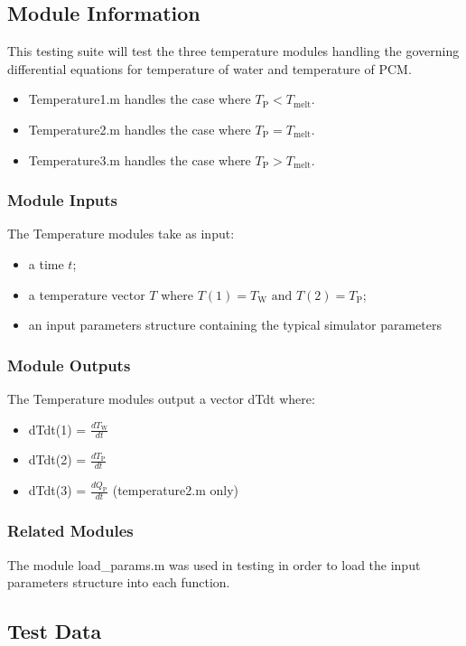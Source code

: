 \documentclass[12pt]{article}
\begin{document}
\subsection{Module Information}
This testing suite will test the three temperature modules handling the governing 
differential equations for temperature of water and temperature of PCM.
\begin{itemize}
\item Temperature1.m handles the case where $T_{\text{P}} < T_{\text{melt}}$.
\item Temperature2.m handles the case where $T_{\text{P}} = T_{\text{melt}}$.
\item Temperature3.m handles the case where $T_{\text{P}} > T_{\text{melt}}$.
\end{itemize}

\subsubsection{Module Inputs}
The Temperature modules take as input:
\begin{itemize}
\item a time $t$;
\item a temperature vector $T$ where $T(1) = T_{\text{W}} \text{ and } 
T(2) = T_{\text{P}}$;
\item an input parameters structure containing the typical simulator parameters
\end{itemize}

\subsubsection{Module Outputs}
The Temperature modules output a vector dTdt where:
\begin{itemize}
\item dTdt(1) = $\frac{dT_{\text{W}}}{dt}$
\item dTdt(2) = $\frac{dT_{\text{P}}}{dt}$
\item dTdt(3) = $\frac{dQ_{\text{P}}}{dt}$ (temperature2.m only)
\end{itemize}

\subsubsection{Related Modules}
The module load\_params.m was used in testing in order to load the input parameters
 structure into each function.

\subsection{Test Data}
\end{document}
